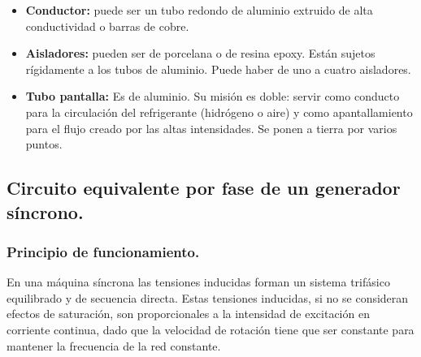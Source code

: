 			\begin{itemize}
				\item \textbf{Conductor:} puede ser un tubo redondo de aluminio extruido de alta conductividad o barras de cobre.
				\item \textbf{Aisladores:} pueden ser de porcelana o de resina epoxy. Están sujetos rígidamente a los tubos de aluminio. Puede haber de uno a cuatro aisladores.
				\item \textbf{Tubo pantalla:} Es de aluminio. Su misión es doble: servir como conducto para la circulación del refrigerante (hidrógeno o aire) y como apantallamiento para el flujo creado por las altas intensidades. Se ponen a tierra por varios puntos.
			\end{itemize}
		
		\subsection{Circuito equivalente por fase de un generador síncrono.}
			\subsubsection{Principio de funcionamiento.}
				En una máquina síncrona las tensiones inducidas forman un sistema trifásico equilibrado y de secuencia directa. Estas tensiones inducidas, si no se consideran efectos de saturación, son proporcionales a la intensidad de excitación en corriente continua, dado que la velocidad de rotación tiene que ser constante para mantener la frecuencia de la red constante.
				
